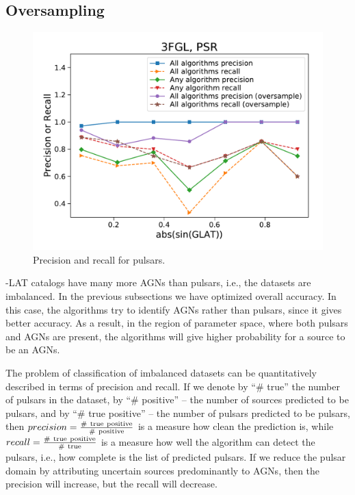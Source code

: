 \subsection{Oversampling}


\begin{figure}[h]
\includegraphics[width=\twopicsp\textwidth]{plots/All_algs_3FGL_precision_recall_oversample.pdf}
\caption{Precision and recall for pulsars.}
\label{fig:prec_recall}
\end{figure}

\Fermi-LAT catalogs have many more AGNs than pulsars, i.e., the datasets are imbalanced.
In the previous subsections we have optimized overall accuracy. In this case, the algorithms try to identify AGNs rather than pulsars,
since it gives better accuracy. As a result, in the region of parameter space, where both pulsars and AGNs are present, the algorithms
will give higher probability for a source to be an AGNs.

The problem of classification of imbalanced datasets can be quantitatively described in terms of precision and recall.
If we denote by ``\# true'' the number of pulsars in the dataset, by ``\# positive'' -- the number of sources predicted to be pulsars, and by 
``\# true positive'' -- the number of pulsars predicted to be pulsars, then  $precision \rm = \frac{\#\ true\ positive}{\#\ positive}$ is a measure how clean the prediction is, while $recall \rm = \frac{\#\ true\ positive}{\#\ true}$ is a measure how well the algorithm can detect the pulsars, i.e., how complete is the list of predicted pulsars.
If we reduce the pulsar domain by attributing uncertain sources predominantly to AGNs, then the precision will increase, but the recall will decrease.

